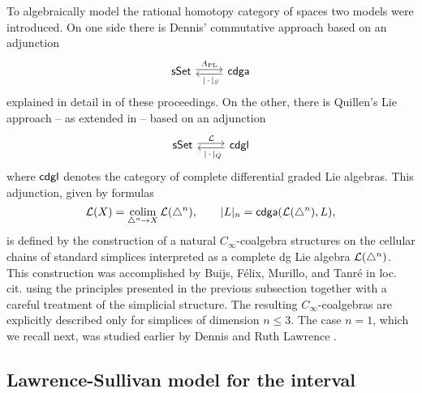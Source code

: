 To algebraically model the rational homotopy category of spaces two models were introduced.
On one side there is Dennis' commutative approach \cite{sullivan1977infinitesimal} based on an adjunction
\[
\begin{tikzcd}
\sSet \arrow[r, shift left=2pt, "A_{\mathrm{PL}}"] &
\cdga \arrow[l, shift left=2pt, "\ \bars{\,\cdot\,}_S"]
\end{tikzcd}
\]
explained in detail in \cite{bibid} of these proceedings.
On the other, there is Quillen's Lie approach \cite{quillen1969rational} -- as extended in \cite{buijs2013algebraicmodels, buijs2020liemodels} -- based on an adjunction
\[
\begin{tikzcd}
\sSet \arrow[r, shift left=2pt, "\cL"] &
\cdgl \arrow[l, shift left=2pt, "\ \bars{\,\cdot\,}_Q"]
\end{tikzcd}
\]
where $\mathsf{cdgl}$ denotes the category of complete differential graded Lie algebras.
This adjunction, given by formulas
\[
\mathcal{L}(X) = \operatorname*{colim}_{\triangle^n \to X} \mathcal{L}(\triangle^n), \qquad
\lvert L\rvert_n = \mathsf{cdga}(\mathcal{L}(\triangle^n), L),
\]
is defined by the construction of a natural $C_\infty$-coalgebra structures on the cellular chains of standard simplices interpreted as a complete dg Lie algebra $\mathcal{L}(\triangle^n)$.
This construction was accomplished by Buijs, F{\'e}lix, Murillo, and Tanr{\'e} in loc. cit. using the principles presented in the previous subsection together with a careful treatment of the simplicial structure.
The resulting $C_\infty$-coalgebras are explicitly described only for simplices of dimension $n \leq 3$.
The case $n = 1$, which we recall next, was studied earlier by Dennis and Ruth Lawrence \cite{lawrence2014interval}.

\subsection{Lawrence-Sullivan model for the interval}

